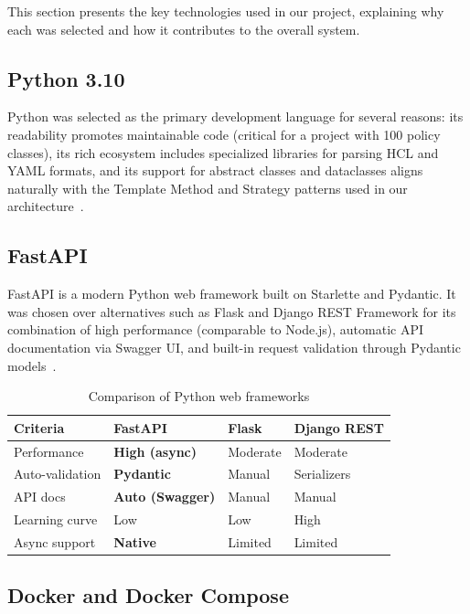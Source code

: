 This section presents the key technologies used in our project, explaining why each was selected and how it contributes to the overall system.

\subsection{Python 3.10}

Python was selected as the primary development language for several reasons: its readability promotes maintainable code (critical for a project with 100 policy classes), its rich ecosystem includes specialized libraries for parsing HCL and YAML formats, and its support for abstract classes and dataclasses aligns naturally with the Template Method and Strategy patterns used in our architecture~\cite{python}.

\subsection{FastAPI}

FastAPI is a modern Python web framework built on Starlette and Pydantic. It was chosen over alternatives such as Flask and Django REST Framework for its combination of high performance (comparable to Node.js), automatic API documentation via Swagger UI, and built-in request validation through Pydantic models~\cite{fastapi}.

\begin{table}[H]
\centering
\caption{Comparison of Python web frameworks}
\label{tab:framework-comparison}
\begin{tabular}{|p{2.5cm}|p{3cm}|p{3cm}|p{3cm}|}
\hline
\textbf{Criteria} & \textbf{FastAPI} & \textbf{Flask} & \textbf{Django REST} \\
\hline
Performance & \cellcolor{green!15}\textbf{High (async)} & Moderate & Moderate \\
\hline
Auto-validation & \cellcolor{green!15}\textbf{Pydantic} & Manual & Serializers \\
\hline
API docs & \cellcolor{green!15}\textbf{Auto (Swagger)} & Manual & Manual \\
\hline
Learning curve & Low & Low & High \\
\hline
Async support & \cellcolor{green!15}\textbf{Native} & Limited & Limited \\
\hline
\end{tabular}
\end{table}

\subsection{Docker and Docker Compose}

